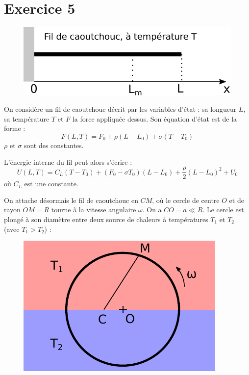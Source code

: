 \documentclass{report}
\begin{document}
\newpage

\section*{Exercice 5}

\begin{figure}[!h]
\centering
\includegraphics[width=0.4\linewidth]{thermo2.pdf}
\end{figure}

On considère un fil de caoutchouc décrit par les variables d'état : sa longueur $L$, sa température $T$ et $F$ la force appliquée dessus. Son équation d'état est de la forme : 
\begin{equation}
	F(L,T) = F_0 + \rho(L-L_0) + \sigma(T-T_0)
\end{equation}
$\rho$ et $\sigma$ sont des constantes. 

L'énergie interne du fil peut alors s'écrire : 
\begin{equation}
	U(L,T) = C_L(T-T_0)+(F_0-\sigma T_0)(L-L_0) +\frac{ \rho}{2}(L-L_0)^2 +U_0
\end{equation}
où $C_L$ est une constante. 

On attache désormais le fil de caoutchouc en $CM$, où le cercle de centre $O$ et de rayon $OM=R$ tourne à la vitesse angulaire $\omega$. On a $CO=a\ll R$. Le cercle est plongé à son diamètre entre deux source de chaleurs à températures $T_1$ et $T_2$  (avec $T_1>T_2$) :

\begin{figure}[!h]
\centering
\includegraphics[width=0.3\linewidth]{thermo3.pdf}
\end{figure}
\end{document}
